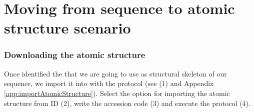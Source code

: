 \section{Moving from sequence to atomic structure scenario}

\subsubsection*{Downloading the atomic structure}
  
  Once identified the  that we are going to use as structural skeleton of our sequence, we import it into \scipion with the protocol  (see  (1) and Appendix \ref{app:importAtomicStructure}). Select the option for importing the atomic structure from ID (2), write the  accession code (3) and execute the protocol (4). 
  
